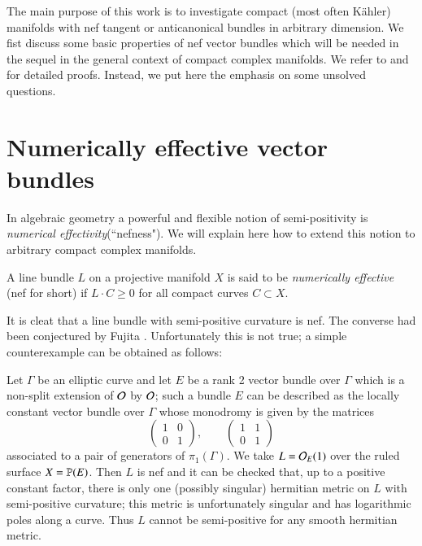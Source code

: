 The main purpose of this work is to investigate compact (most often K\"ahler) manifolds with nef tangent or anticanonical bundles in arbitrary dimension. We fist discuss some basic properties of nef vector bundles which will be needed in the sequel in the general context of compact complex manifolds. We refer to \cite{art5-keyDPS91} and  \cite{art5-keyDPS92} for detailed proofs. Instead, we put here the emphasis on some unsolved questions.

\section{Numerically effective vector bundles}\label{art5-sec-1}

In algebraic geometry a powerful and flexible notion of semi-positivity is \textit{numerical effectivity}(``nefness"). We will explain here how to extend this notion to arbitrary compact complex manifolds.

\begin{definition}\label{art5-definition-1.1}
A line bundle $L$ on a projective manifold $X$ is said to be \textit{numerically effective} (nef for short) if $L\cdot C \geq 0$ for all compact curves $C \subset X$.

It is cleat that a line bundle with semi-positive curvature is nef. The converse had been conjectured by Fujita \cite{art5-keyFu83}. Unfortunately this is not true; a simple counterexample can be obtained as follows:
\end{definition}

\begin{example}\label{art5-example-1.2}
Let $\Gamma$ be an elliptic curve and let $E$ be a rank 2 vector bundle over $\Gamma$ which is a non-split extension of $\mathcal{O}$ by $\mathcal{O}$; such a bundle $E$ can be described as the locally constant vector bundle over $\Gamma$ whose monodromy is given by the matrices
$$
\begin{pmatrix}
1 & 0\\
0 & 1
\end{pmatrix}
,\qquad
\begin{pmatrix}
1 & 1\\
0 & 1
\end{pmatrix}
$$
associated to a pair of generators of $\pi_{1}(\Gamma)$. We take $L=\mathcal{O}_{E}(1)$ over the ruled surface $X= \mathbb{P}(E)$. Then $L$ is nef and it can be checked that, up to a positive constant factor, there is only one (possibly singular) hermitian metric on $L$ with semi-positive curvature; this metric is  unfortunately singular and has logarithmic poles along a curve. Thus $L$ cannot be semi-positive for any smooth hermitian metric. 
\end{example}

